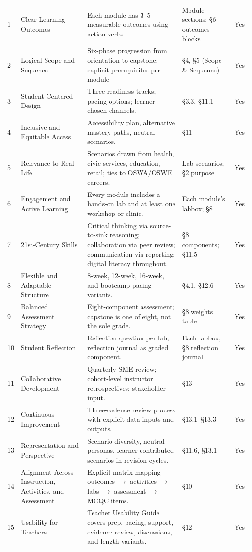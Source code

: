 \documentclass[11pt,letterpaper,oneside]{report}
\begin{document}
\begin{longtable}{@{}R{0.45cm} R{3.95cm} R{4.61cm} R{4.61cm} R{1.20cm}@{}}
1 & Clear Learning Outcomes
  & Each module has 3--5 measurable outcomes using action verbs.
  & Module sections; \S6 outcomes blocks
  & Yes\\
2 & Logical Scope and Sequence
  & Six-phase progression from orientation to capstone; explicit prerequisites per module.
  & \S4, \S5 (Scope \& Sequence)
  & Yes\\
3 & Student-Centered Design
  & Three readiness tracks; pacing options; learner-chosen channels.
  & \S3.3, \S11.1
  & Yes\\
4 & Inclusive and Equitable Access
  & Accessibility plan, alternative mastery paths, neutral scenarios.
  & \S11
  & Yes\\
5 & Relevance to Real Life
  & Scenarios drawn from health, civic services, education, retail; ties to OSWA/OSWE careers.
  & Lab scenarios; \S2 purpose
  & Yes\\
6 & Engagement and Active Learning
  & Every module includes a hands-on lab and at least one workshop or clinic.
  & Each module's labbox; \S8
  & Yes\\
7 & 21st-Century Skills
  & Critical thinking via source-to-sink reasoning; collaboration via peer review; communication via reporting; digital literacy throughout.
  & \S8 components; \S11.5
  & Yes\\
8 & Flexible and Adaptable Structure
  & 8-week, 12-week, 16-week, and bootcamp pacing variants.
  & \S4.1, \S12.6
  & Yes\\
9 & Balanced Assessment Strategy
  & Eight-component assessment; capstone is one of eight, not the sole grade.
  & \S8 weights table
  & Yes\\
10 & Student Reflection
  & Reflection question per lab; reflection journal as graded component.
  & Each labbox; \S8 reflection journal
  & Yes\\
11 & Collaborative Development
  & Quarterly SME review; cohort-level instructor retrospectives; stakeholder input.
  & \S13
  & Yes\\
12 & Continuous Improvement
  & Three-cadence review process with explicit data inputs and outputs.
  & \S13.1--\S13.3
  & Yes\\
13 & Representation and Perspective
  & Scenario diversity, neutral personas, learner-contributed scenarios in revision cycles.
  & \S11.6, \S13.1
  & Yes\\
14 & Alignment Across Instruction, Activities, and Assessment
  & Explicit matrix mapping outcomes $\to$ activities $\to$ labs $\to$ assessment $\to$ MCQC items.
  & \S10
  & Yes\\
15 & Usability for Teachers
  & Teacher Usability Guide covers prep, pacing, support, evidence review, discussions, and length variants.
  & \S12
  & Yes\\
\end{longtable}
\end{document}

